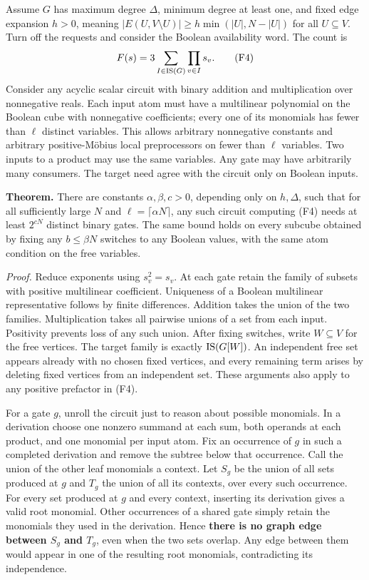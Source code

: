 \documentclass[11pt,a4paper]{article}
\begin{document}
Assume \(G\) has maximum degree \(\Delta\), minimum degree at least one,
and fixed edge expansion \(h>0\), meaning
\(|E(U,V\setminus U)|\ge h\min(|U|,N-|U|)\) for all \(U\subseteq V\).
Turn off the requests and consider the Boolean availability word. The
count is \[
 F(s)=3\sum_{I\in{\rm IS}(G)}\prod_{v\in I}s_v.
 \tag{F4}
\] Consider any acyclic scalar circuit with binary addition and
multiplication over nonnegative reals. Each input atom must have a
multilinear polynomial on the Boolean cube with nonnegative
coefficients; every one of its monomials has fewer than \(\ell\)
distinct variables. This allows arbitrary nonnegative constants and
arbitrary positive-Möbius local preprocessors on fewer than \(\ell\)
variables. Two inputs to a product may use the same variables. Any gate
may have arbitrarily many consumers. The target need agree with the
circuit only on Boolean inputs.

\textbf{Theorem.} There are constants \(\alpha,\beta,c>0\), depending
only on \(h,\Delta\), such that for all sufficiently large \(N\) and
\(\ell=\lceil\alpha N\rceil\), any such circuit computing (F4) needs at
least \(2^{cN}\) distinct binary gates. The same bound holds on every
subcube obtained by fixing any \(b\le\beta N\) switches to any Boolean
values, with the same atom condition on the free variables.

\emph{Proof.} Reduce exponents using \(s_v^2=s_v\). At each gate retain
the family of subsets with positive multilinear coefficient. Uniqueness
of a Boolean multilinear representative follows by finite differences.
Addition takes the union of the two families. Multiplication takes all
pairwise unions of a set from each input. Positivity prevents loss of
any such union. After fixing switches, write \(W\subseteq V\) for the
free vertices. The target family is exactly \({\rm IS}(G[W])\). An
independent free set appears already with no chosen fixed vertices, and
every remaining term arises by deleting fixed vertices from an
independent set. These arguments also apply to any positive prefactor in
(F4).

For a gate \(g\), unroll the circuit just to reason about possible
monomials. In a derivation choose one nonzero summand at each sum, both
operands at each product, and one monomial per input atom. Fix an
occurrence of \(g\) in such a completed derivation and remove the
subtree below that occurrence. Call the union of the other leaf
monomials a context. Let \(S_g\) be the union of all sets produced at
\(g\) and \(T_g\) the union of all its contexts, over every such
occurrence. For every set produced at \(g\) and every context, inserting
its derivation gives a valid root monomial. Other occurrences of a
shared gate simply retain the monomials they used in the derivation.
Hence \textbf{there is no graph edge between \(S_g\) and \(T_g\)}, even
when the two sets overlap. Any edge between them would appear in one of
the resulting root monomials, contradicting its independence.
\end{document}

